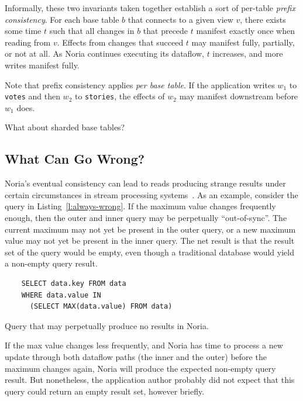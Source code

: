 Informally, these two invariants taken together establish a sort of per-table
\emph{prefix consistency}. For each base table $b$ that connects to a given view
$v$, there exists some time $t$ such that all changes in $b$ that precede $t$
manifest exactly once when reading from $v$. Effects from changes that succeed
$t$ may manifest fully, partially, or not at all. As Noria continues executing
its dataflow, $t$ increases, and more writes manifest fully.

Note that prefix consistency applies \emph{per base table}. If the application
writes $w_1$ to \texttt{votes} and then $w_2$ to \texttt{stories}, the effects
of $w_2$ may manifest downstream before $w_1$ does.

\begin{inprogress}
  What about sharded base tables?
\end{inprogress}

\subsection{What Can Go Wrong?}

Noria's eventual consistency can lead to reads producing strange results
under certain circumstances in stream processing
systems~\cite{materialize-eventual}. As an example, consider the query in
Listing~\vref{l:always-wrong}. If the maximum value changes frequently enough,
then the outer and inner query may be perpetually ``out-of-sync''. The current
maximum may not yet be present in the outer query, or a new maximum value may
not yet be present in the inner query. The net result is that the result set of
the query would be empty, even though a traditional database would yield a
non-empty query result.

\begin{listing}[h]
  \begin{verbatim}
    SELECT data.key FROM data
    WHERE data.value IN
      (SELECT MAX(data.value) FROM data)
  \end{verbatim}
  \caption{Query that may perpetually produce no results in Noria.}
  \label{l:always-wrong}
\end{listing}

If the max value changes less frequently, and Noria has time to process a new
update through both dataflow paths (the inner and the outer) before the maximum
changes again, Noria will produce the expected non-empty query result. But
nonetheless, the application author probably did not expect that this query
could return an empty result set, however briefly.

